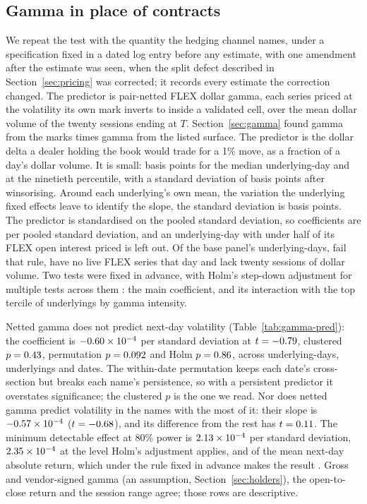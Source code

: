 \documentclass[11pt]{article}
\begin{document}
\subsection{Gamma in place of contracts}
\label{sec:gamma-pred}

We repeat the test with the quantity the hedging channel names, under a specification
fixed in a dated log entry before any estimate, with one amendment after the estimate
was seen, when the split defect described in Section~\ref{sec:pricing} was corrected; it
records every estimate the correction changed. The predictor is pair-netted FLEX dollar
gamma, each
series priced at the volatility its own mark inverts to inside a validated cell, over the
mean dollar volume of the twenty sessions ending at $T$. Section~\ref{sec:gamma} found
gamma from the marks \GammaMarkRatio{} times gamma from the listed surface. The predictor
is the dollar delta a dealer holding the book would trade for a 1\% move, as a fraction of a day's
dollar volume. It is small: \GPredMedianX{} basis points for the median underlying-day and
\GPredNinetyX{} at the ninetieth percentile, with a standard deviation of \GPredSdX{}
basis points after winsorising. Around each underlying's own mean, the variation the
underlying fixed effects leave to identify the slope, the standard deviation is
\GPredWithinSdX{} basis points. The predictor is standardised on the pooled standard
deviation, so coefficients are per pooled
standard deviation, and an underlying-day with under half of its FLEX open interest priced is
left out. Of the base panel's underlying-days, \GPredExcluded{} fail that rule,
\GPredNoGammaRow{} have no live FLEX series that day and \GPredNoVolume{} lack twenty
sessions of dollar volume. Two tests were fixed in advance, with Holm's step-down
adjustment for multiple tests across them \citep{holm1979}: the
main coefficient, and its interaction with the top tercile of underlyings by gamma
intensity.



Netted gamma does not predict next-day volatility (Table~\ref{tab:gamma-pred}): the
coefficient is $-0.60\times10^{-4}$ per standard deviation at $t=-0.79$,
clustered $p=0.43$, permutation $p=0.092$ and Holm $p=0.86$, across
\GPredDays{} underlying-days, \GPredUnderlyings{} underlyings and \GPredDates{} dates.
The within-date permutation keeps each date's cross-section but breaks each name's
persistence, so with a persistent predictor it overstates significance; the clustered $p$
is the one we read. Nor does netted gamma predict volatility in the names with the most of
it: their slope is $-0.57\times10^{-4}$ ($t=-0.68$), and its
difference from the rest has $t=0.11$. The minimum detectable effect at 80\% power
is $2.13\times10^{-4}$ per standard deviation, $2.35\times10^{-4}$ at the
level Holm's adjustment applies, and \GPredMDEShare{} of the mean next-day absolute
return, which under the rule fixed in advance makes the result \GPredVerdict{}. Gross and
vendor-signed gamma (an assumption, Section~\ref{sec:holders}), the
open-to-close return and the session range agree; those rows are descriptive.
\end{document}
